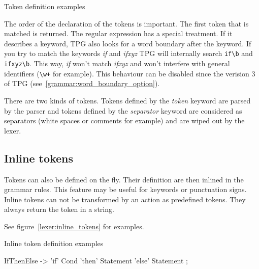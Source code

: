 \begin{code}
\caption{Token definition examples}                         \label{lexer:tokens}
\end{code}

The order of the declaration of the tokens is important. The first token that is matched is returned. The regular expression has a special treatment. If it describes a keyword, TPG also looks for a word boundary after the keyword. If you try to match the keywords \emph{if} and \emph{ifxyz} TPG will internally search \verb$if\b$ and \verb$ifxyz\b$. This way, \emph{if} won't match \emph{ifxyz} and won't interfere with general identifiers (\verb$\w+$ for example). This behaviour can be disabled since the verision 3 of TPG (see~\ref{grammar:word_boundary_option}).

There are two kinds of tokens. Tokens defined by the \emph{token} keyword are parsed by the parser and tokens defined by the \emph{separator} keyword are considered as separators (white spaces or comments for example) and are wiped out by the lexer.

\subsection{Inline tokens}

Tokens can also be defined on the fly. Their definition are then inlined in the grammar rules.
This feature may be useful for keywords or punctuation signs.
Inline tokens can not be transformed by an action as predefined tokens.
They always return the token in a string.

See figure~\ref{lexer:inline_tokens} for examples.

\begin{code}
\caption{Inline token definition examples}                  \label{lexer:inline_tokens}
\begin{verbatimtab}[4]
    IfThenElse ->
        'if' Cond
        'then' Statement
        'else' Statement
        ;
\end{verbatimtab}
\end{code}

